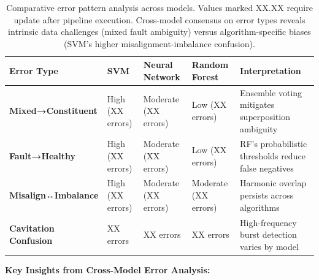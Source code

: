 \documentclass[11pt,a4paper]{article}
\begin{document}
\begin{table}[h]
\centering
\small
\begin{tabular}{@{}lp{2.5cm}p{2.5cm}p{2.5cm}p{3cm}@{}}
\toprule
\textbf{Error Type} & \textbf{SVM} & \textbf{Neural Network} & \textbf{Random Forest} & \textbf{Interpretation} \\
\midrule
\textbf{Mixed→Constituent} & High (XX errors) & Moderate (XX errors) & Low (XX errors) & Ensemble voting mitigates superposition ambiguity \\
\midrule
\textbf{Fault→Healthy} & High (XX errors) & Moderate (XX errors) & Low (XX errors) & RF's probabilistic thresholds reduce false negatives \\
\midrule
\textbf{Misalign↔Imbalance} & High (XX errors) & Moderate (XX errors) & Moderate (XX errors) & Harmonic overlap persists across algorithms \\
\midrule
\textbf{Cavitation Confusion} & XX errors & XX errors & XX errors & High-frequency burst detection varies by model \\
\bottomrule
\end{tabular}
\caption{Comparative error pattern analysis across models. Values marked XX.XX require update after pipeline execution. Cross-model consensus on error types reveals intrinsic data challenges (mixed fault ambiguity) versus algorithm-specific biases (SVM's higher misalignment-imbalance confusion).}
\label{tab:error_patterns}
\end{table}

\textbf{Key Insights from Cross-Model Error Analysis:}
\end{document}
